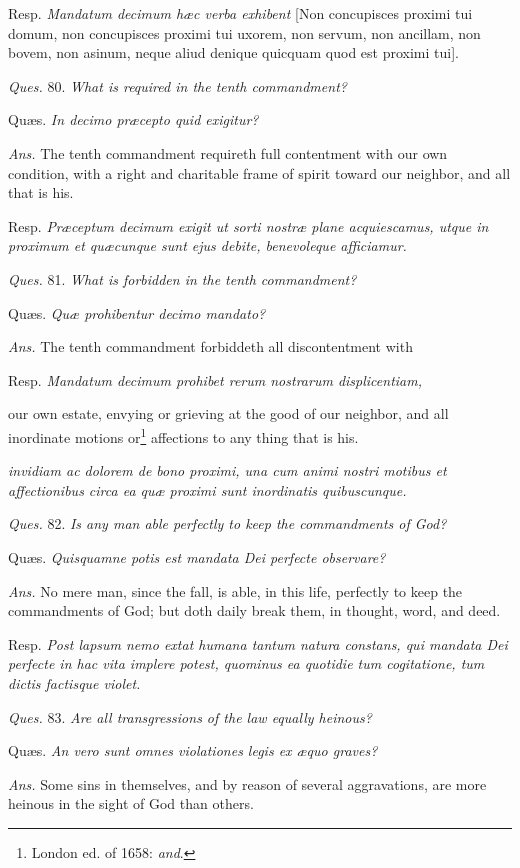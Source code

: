 Resp. \emph{Mandatum decimum hæc verba exhibent} [Non concupisces proximi tui domum, non concupisces proximi tui uxorem, non servum, non ancillam, non bovem, non asinum, neque aliud denique quicquam quod est proximi tui].

\emph{Ques.} 80. \emph{What is required in the tenth commandment?}

Quæs. \emph{In decimo præcepto quid exigitur?}

\emph{Ans.} The tenth commandment requireth full contentment with our own condition, with a right and charitable frame of spirit toward our neighbor, and all that is his.

Resp. \emph{Præceptum decimum exigit ut sorti nostræ plane acquiescamus, utque in proximum et quæcunque sunt ejus debite, benevoleque afficiamur.}

\emph{Ques.} 81. \emph{What is forbidden in the tenth commandment?}

Quæs. \emph{Quæ prohibentur decimo mandato?}

\emph{Ans.} The tenth commandment forbiddeth all discontentment with

Resp. \emph{Mandatum decimum prohibet rerum nostrarum displicentiam, }

our own estate, envying or grieving at the good of our neighbor, and all inordinate motions or\footnote{London ed. of 1658: \emph{and}.} affections to any thing that is his.

\emph{invidiam ac dolorem de bono proximi, una cum animi nostri motibus et affectionibus circa ea quæ proximi sunt inordinatis quibuscunque.}

\emph{Ques.} 82. \emph{Is any man able perfectly to keep the commandments of God?}

Quæs. \emph{Quisquamne potis est mandata Dei perfecte observare?}

\emph{Ans.} No mere man, since the fall, is able, in this life, perfectly to keep the commandments of God; but doth daily break them, in thought, word, and deed.

Resp. \emph{Post lapsum nemo extat humana tantum natura constans, qui mandata Dei perfecte in hac vita implere potest, quominus ea quotidie tum cogitatione, tum dictis factisque violet.}

\emph{Ques.} 83. \emph{Are all transgressions of the law equally heinous?}

Quæs. \emph{An vero sunt omnes violationes legis ex æquo graves?}

\emph{Ans.} Some sins in themselves, and by reason of several aggravations, are more heinous in the sight of God than others.

